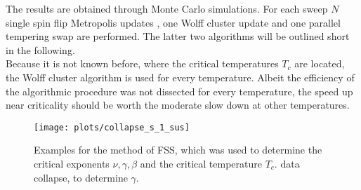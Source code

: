 The results are obtained through Monte Carlo simulations.
For each sweep \(N\) single spin flip Metropolis updates \cite{Metropolis1953}, one
Wolff cluster update \cite{Wolff1989} and one parallel tempering swap \cite{ParallelTempering1986} are
performed. The latter two algorithms will be outlined short in the following.\\
Because it is not known before, where the critical temperatures
\(T_c\) are located, the Wolff cluster algorithm is used for
every temperature. Albeit the efficiency of the algorithmic procedure
was not dissected for every temperature, the speed up
near criticality should be worth the moderate slow down at other temperatures.

\begin{figure}[htb]
    \centering
    \texttt{[image: plots/collapse\_s\_1\_sus]}
    \caption[Examples of Determining Critical Temperature and Exponents]
    {
        Examples for the method of FSS, which was used
        to determine the critical exponents \(\nu, \gamma, \beta\) and
        the critical temperature \(T_c\).
        data collapse, to determine \(\gamma\).
    }
    \label{fig:gettingCrit2}
\end{figure}


